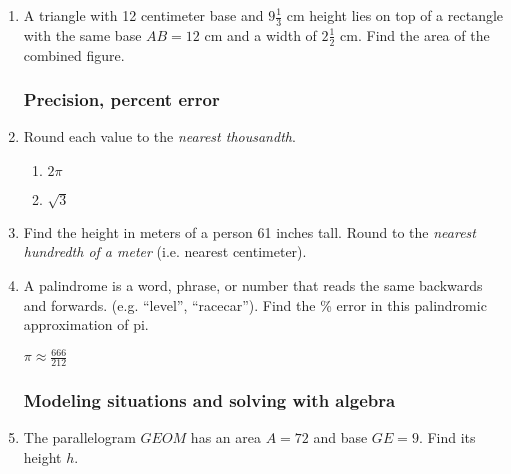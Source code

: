 \begin{enumerate}
\newpage
\item A triangle with 12 centimeter base and $9 \frac{1}{3}$ cm height lies on top of a rectangle with the same base $AB=12$ cm and a width of $2 \frac{1}{2}$ cm. Find the area of the combined figure. \par \medskip
   \vspace{1.0cm}

\subsubsection*{Precision, percent error}
\item Round each value to the \emph{nearest thousandth}.
  \begin{multicols}{2}
    \begin{enumerate}
      \item $2 \pi$
      \item $\sqrt{3}$
    \end{enumerate}
  \end{multicols} \bigskip 

\item Find the height in meters of a person 61 inches tall. Round to the \emph{nearest hundredth of a meter} (i.e. nearest centimeter).
\vspace{3cm}

\item A palindrome is a word, phrase, or number that reads the same backwards and forwards. (e.g. ``level'', ``racecar''). Find the \% error in this palindromic approximation of pi. \par \bigskip
  $\displaystyle \pi \approx \frac{666}{212}$ \vspace{1.5cm}
  
\newpage
\subsubsection*{Modeling situations and solving with algebra}
\item The parallelogram $GEOM$ has an area $A=72$ and base $GE=9$. Find its height $h$. \par


\end{enumerate}
